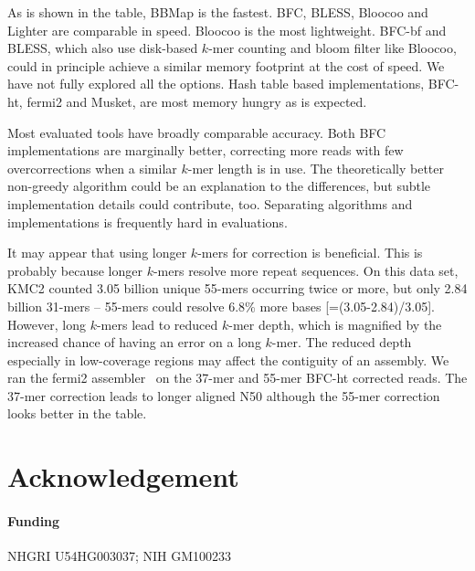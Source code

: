 \documentclass{bioinfo}
\begin{document}
As is shown in the table, BBMap is the fastest. BFC, BLESS, Bloocoo and Lighter
are comparable in speed. Bloocoo is the most lightweight. BFC-bf and BLESS,
which also use disk-based $k$-mer counting and bloom filter like Bloocoo, could
in principle achieve a similar memory footprint at the cost of speed. We have
not fully explored all the options. Hash table based implementations, BFC-ht,
fermi2 and Musket, are most memory hungry as is expected.

Most evaluated tools have broadly comparable accuracy. Both BFC implementations
are marginally better, correcting more reads with few overcorrections when a
similar $k$-mer length is in use. The theoretically better non-greedy algorithm
could be an explanation to the differences, but subtle implementation details
could contribute, too. Separating algorithms and implementations is frequently
hard in evaluations.

It may appear that using longer $k$-mers for correction is beneficial. This is
probably because longer $k$-mers resolve more repeat sequences. On this data
set, KMC2 counted 3.05 billion unique 55-mers occurring twice or more, but only
2.84 billion 31-mers -- 55-mers could resolve 6.8\% more bases
[=(3.05-2.84)/3.05]. However, long $k$-mers lead to reduced $k$-mer depth,
which is magnified by the increased chance of having an error on a long $k$-mer.
The reduced depth especially in low-coverage regions may affect the contiguity
of an assembly. We ran the fermi2 assembler~\citep{Li:2012fk} on the 37-mer
and 55-mer BFC-ht corrected reads. The 37-mer correction leads to longer
aligned N50 although the 55-mer correction looks better in the table.

\section*{Acknowledgement}
\paragraph{Funding\textcolon} NHGRI U54HG003037; NIH GM100233


\end{document}

